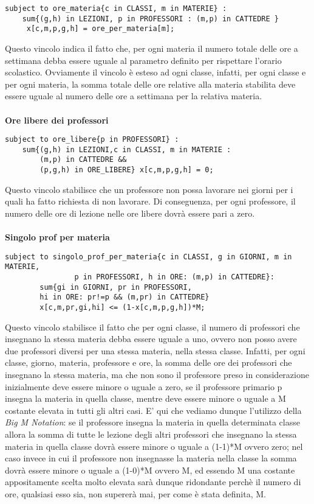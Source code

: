\documentclass{article}
\begin{document}
\begin{verbatim}
subject to ore_materia{c in CLASSI, m in MATERIE} :
	sum{(g,h) in LEZIONI, p in PROFESSORI : (m,p) in CATTEDRE }
	 x[c,m,p,g,h] = ore_per_materia[m];
\end{verbatim}
Questo vincolo indica il fatto che, per ogni materia il numero totale delle ore a settimana debba essere uguale al parametro definito per rispettare l'orario scolastico. Ovviamente il vincolo è esteso ad ogni classe, infatti, per ogni classe e per ogni materia, la somma totale delle ore relative alla materia stabilita deve essere uguale al numero delle ore a settimana per la relativa materia.
\\\\\textbf{Ore libere dei professori}
\begin{verbatim}
subject to ore_libere{p in PROFESSORI} :
	sum{(g,h) in LEZIONI,c in CLASSI, m in MATERIE :
		(m,p) in CATTEDRE &&
		(p,g,h) in ORE_LIBERE} x[c,m,p,g,h] = 0;
\end{verbatim}
Questo vincolo stabilisce che un professore non possa lavorare nei giorni per i quali ha fatto richiesta di non lavorare. Di conseguenza, per ogni professore, il numero delle ore di lezione nelle ore libere dovrà essere pari a zero.
\\\\\textbf{Singolo prof per materia}
\begin{verbatim}
subject to singolo_prof_per_materia{c in CLASSI, g in GIORNI, m in MATERIE, 
                p in PROFESSORI, h in ORE: (m,p) in CATTEDRE}:
		sum{gi in GIORNI, pr in PROFESSORI, 
		hi in ORE: pr!=p && (m,pr) in CATTEDRE}
		x[c,m,pr,gi,hi] <= (1-x[c,m,p,g,h])*M;
\end{verbatim}
Questo vincolo stabilisce il fatto che per ogni classe, il numero di professori che insegnano la stessa materia debba essere uguale a uno, ovvero non posso avere due professori diversi per una stessa materia, nella stessa classe. Infatti, per ogni classe, giorno, materia, professore e ore, la somma delle ore dei professori che insegnano la stessa materia, ma che non sono il professore preso in considerazione inizialmente deve essere minore o uguale a zero, se il professore primario p insegna la materia in quella classe, mentre deve essere minore o uguale a M costante elevata in tutti gli altri casi. E' qui che vediamo dunque l'utilizzo della \emph{Big M Notation}: se il professore insegna la materia in quella determinata classe allora la somma di tutte le lezione degli altri professori che insegnano la stessa materia in quella classe dovrà essere minore o uguale a (1-1)*M ovvero zero; nel caso invece in cui il professore non insegnasse la materia nella classe la somma dovrà essere minore o uguale a (1-0)*M ovvero M, ed essendo M una costante appositamente scelta molto elevata sarà dunque ridondante perchè il numero di ore, qualsiasi esso sia, non supererà mai, per come è stata definita, M.
\end{document}
